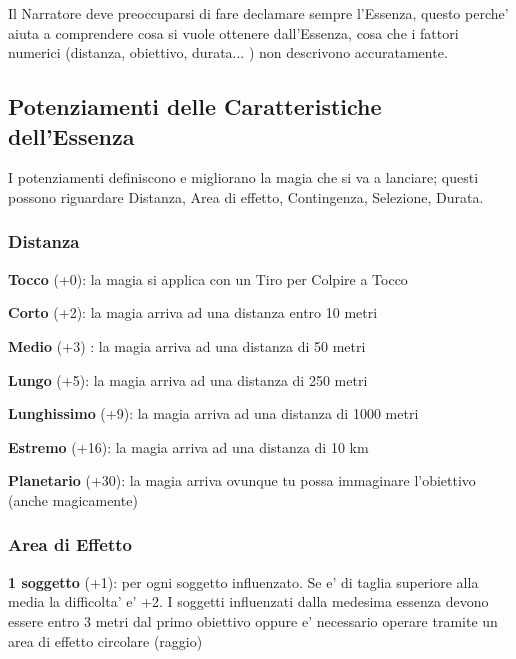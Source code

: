 \documentclass[a4paper,11pt,twoside,openany]{dndbook}
\begin{document}
Il Narratore deve preoccuparsi di fare declamare sempre l'Essenza, questo perche' aiuta a comprendere cosa si vuole ottenere dall'Essenza, cosa che i fattori numerici (distanza, obiettivo, durata... ) non descrivono accuratamente.

\subsection{Potenziamenti delle Caratteristiche dell'Essenza}

\label{potenziamenti-delle-caratteristiche-dellessenza}

I potenziamenti definiscono e migliorano la magia che si va a lanciare; questi possono riguardare Distanza, Area di effetto, Contingenza, Selezione, Durata.

\subsubsection{Distanza}

\label{distanza}

\textbf{Tocco} (+0): la magia si applica con un Tiro per Colpire a
Tocco

\textbf{Corto} (+2): la magia arriva ad una distanza entro 10 metri

\textbf{Medio} (+3) : la magia arriva ad una distanza di 50 metri

\textbf{Lungo} (+5): la magia arriva ad una distanza di 250 metri

\textbf{Lunghissimo} (+9): la magia arriva ad una distanza di 1000 metri

\textbf{Estremo} (+16): la magia arriva ad una distanza di 10 km

\textbf{Planetario} (+30): la magia arriva ovunque tu possa immaginare l'obiettivo (anche magicamente)

\subsubsection{Area di Effetto}

\label{area-di-effetto}

\textbf{1 soggetto} (+1): per ogni soggetto influenzato. Se e' di taglia superiore alla media la difficolta' e' +2. I soggetti influenzati dalla medesima essenza devono essere entro 3 metri dal primo obiettivo oppure e' necessario operare tramite un area di effetto circolare (raggio)
\end{document}

